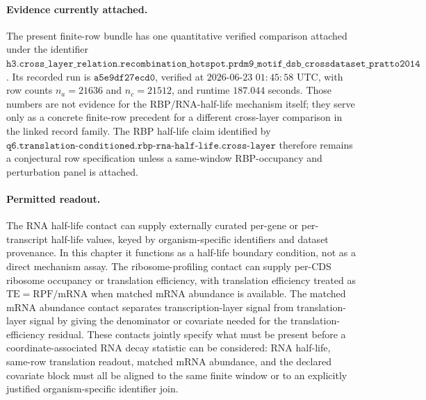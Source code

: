 \paragraph{Evidence currently attached.}
The present finite-row bundle has one quantitative verified comparison attached under the identifier $\texttt{h3.cross\_layer\_relation.recombination\_hotspot.prdm9\_motif\_dsb\_crossdataset\_pratto2014}$.  Its recorded run is $\texttt{a5e9df27ecd0}$, verified at $2026$-$06$-$23$ $01{:}45{:}58$ UTC, with row counts $n_a = 21636$ and $n_c = 21512$, and runtime $187.044$ seconds.  Those numbers are not evidence for the RBP/RNA-half-life mechanism itself; they serve only as a concrete finite-row precedent for a different cross-layer comparison in the linked record family.  The RBP half-life claim identified by $\texttt{q6.translation-conditioned.rbp-rna-half-life.cross-layer}$ therefore remains a conjectural row specification unless a same-window RBP-occupancy and perturbation panel is attached.

\paragraph{Permitted readout.}
The RNA half-life contact can supply externally curated per-gene or per-transcript half-life values, keyed by organism-specific identifiers and dataset provenance.  In this chapter it functions as a half-life boundary condition, not as a direct mechanism assay.  The ribosome-profiling contact can supply per-CDS ribosome occupancy or translation efficiency, with translation efficiency treated as $\mathrm{TE}=\mathrm{RPF}/\mathrm{mRNA}$ when matched mRNA abundance is available.  The matched mRNA abundance contact separates transcription-layer signal from translation-layer signal by giving the denominator or covariate needed for the translation-efficiency residual.  These contacts jointly specify what must be present before a coordinate-associated RNA decay statistic can be considered: RNA half-life, same-row translation readout, matched mRNA abundance, and the declared covariate block must all be aligned to the same finite window or to an explicitly justified organism-specific identifier join.

